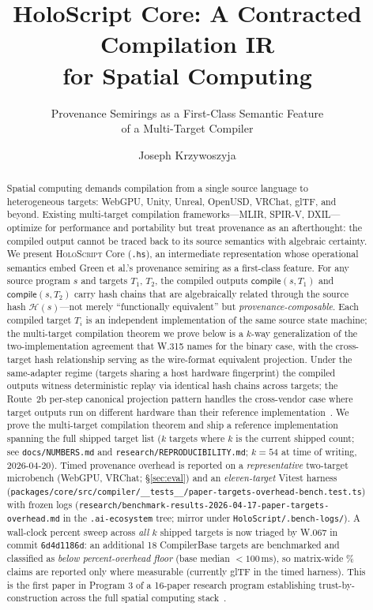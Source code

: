 \documentclass[sigconf,nonacm]{acmart}
\title{HoloScript Core: A Contracted Compilation IR\\
for Spatial Computing}
\subtitle{Provenance Semirings as a First-Class Semantic Feature\\
of a Multi-Target Compiler}
\author{Joseph Krzywoszyja}
\affiliation{%
  \institution{Infinitus Systems}
  \country{USA}
}
\newcommand{\holoscript}{\textsc{HoloScript}}
\newcommand{\hscore}{\texttt{.hs}}
\newcommand{\hashfn}{\mathcal{H}}
\newcommand{\compilefn}{\mathsf{compile}}
\begin{document}
\begin{abstract}
Spatial computing demands compilation from a single source language
to heterogeneous targets: WebGPU, Unity, Unreal, OpenUSD, VRChat,
glTF, and beyond. Existing multi-target compilation
frameworks---MLIR, SPIR-V, DXIL---optimize for performance and
portability but treat provenance as an afterthought: the compiled
output cannot be traced back to its source semantics with
algebraic certainty. We present \holoscript{} Core (\hscore{}),
an intermediate representation whose operational semantics embed
Green et al.'s provenance semiring as a first-class feature.
For any source program $s$ and targets $T_1$, $T_2$, the compiled
outputs $\compilefn(s, T_1)$ and $\compilefn(s, T_2)$ carry
hash chains that are algebraically related through the source
hash $\hashfn(s)$---not merely ``functionally equivalent'' but
\emph{provenance-composable}. Each compiled target $T_i$ is an
independent implementation of the same source state machine; the
multi-target compilation theorem we prove below is a $k$-way
generalization of the two-implementation agreement that W.315 names
for the binary case, with the cross-target hash relationship serving
as the wire-format equivalent projection. Under the same-adapter regime
(targets sharing a host hardware fingerprint) the compiled outputs
witness deterministic replay via identical hash chains across targets;
the Route~2b per-step canonical projection pattern handles the
cross-vendor case where target outputs run on different hardware than
their reference implementation~\cite{paper-0c-twin-test-2026-05-11}. We prove the multi-target
compilation theorem and ship a reference implementation spanning
the full shipped target list ($k$ targets where $k$ is the current shipped count;
see \texttt{docs/NUMBERS.md} and \texttt{research/REPRODUCIBILITY.md};
$k=54$ at time of writing, 2026-04-20). Timed provenance overhead is
reported on a \emph{representative} two-target microbench (WebGPU,
VRChat; \S\ref{sec:eval}) and an \emph{eleven-target} Vitest harness
(\texttt{packages/core/src/compiler/\_\_tests\_\_/paper-targets-overhead-bench.test.ts})
with frozen logs (\texttt{research/benchmark-results-2026-04-17-paper-targets-overhead.md}
in the \texttt{.ai-ecosystem} tree; mirror under \texttt{HoloScript/.bench-logs/}).
A wall-clock percent sweep across \emph{all $k$} shipped targets
is now triaged by W.067 in commit \texttt{6d4d1186d}: an additional 18 CompilerBase
targets are benchmarked and classified as \emph{below percent-overhead floor}
(base median $<100$\,ms), so matrix-wide \% claims are reported only where measurable
(currently glTF in the timed harness).
This is the first paper in
Program 3 of a 16-paper research program establishing
trust-by-construction across the full spatial computing
stack~\cite{trustbyconstruction2026,capstone-uist2027}.
\end{abstract}
\end{document}
